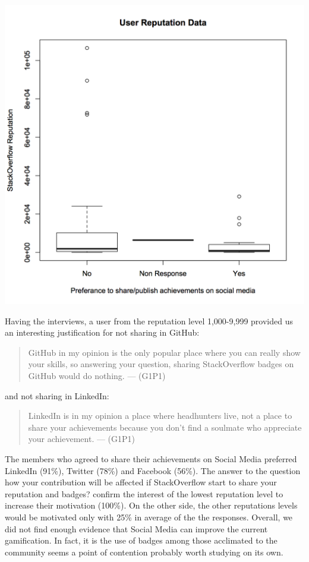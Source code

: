 \documentclass{sigchi}
\begin{document}
\includegraphics[scale=0.5]{figures/boxplot_reputation_compare_publish_reputation_bool.png}

Having the interviews, a user from the reputation level 1,000-9,999 provided us an interesting justification for not sharing in GitHub: 
\begin{quote}
GitHub in my opinion is the only popular place where you can really show your skills, so answering your question, sharing StackOverflow badges on GitHub would do nothing. --- (G1P1)
\end{quote}
and not sharing in LinkedIn: 
\begin{quote}
LinkedIn is in my opinion a place where headhunters live, not a place to share your achievements because you don’t find a soulmate who appreciate your achievement. --- (G1P1)
\end{quote}
The members who agreed to share their achievements on Social Media preferred LinkedIn (91\%), Twitter (78\%) and Facebook (56\%). The answer to the question how your contribution will be affected if StackOverflow start to share your reputation and badges? confirm the interest of the lowest reputation level to increase their motivation (100\%). On the other side, the other reputations levels would be motivated only with 25\% in average of the the responses. Overall, we did not find enough evidence that Social Media can improve the current gamification. In fact, it is the use of badges among those acclimated to the community seems a point of contention probably worth studying on its own.
\end{document}
